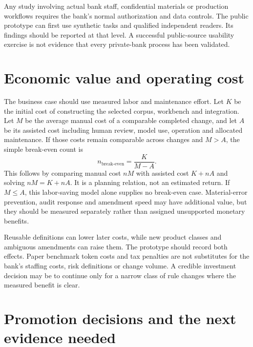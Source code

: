 \documentclass[12pt,a4paper,oneside,openany]{book}
\begin{document}
Any study involving actual bank staff, confidential materials or production
workflows requires the bank's normal authorization and data controls. The public
prototype can first use synthetic tasks and qualified independent readers.
Its findings should be reported at that level. A successful public-source
usability exercise is not evidence that every private-bank process has been
validated.

\section{Economic value and operating cost}
\label{merge:P-04-prototype:06}


The business case should use measured labor and maintenance effort. Let $K$ be
the initial cost of constructing the selected corpus, workbench and integration.
Let $M$ be the average manual cost of a comparable completed change, and let $A$
be its assisted cost including human review, model use, operation and allocated
maintenance. If those costs remain comparable across changes and $M>A$, the
simple break-even count is
\begin{equation}
 n_{\mathrm{break\text{-}even}}=\frac{K}{M-A}.
 \label{eq:cost}
\end{equation}
This follows by comparing manual cost $nM$ with assisted cost $K+nA$ and solving
$nM=K+nA$. It is a planning relation, not an estimated return. If $M\leq A$, this
labor-saving model alone supplies no break-even case. Material-error prevention,
audit response and amendment speed may have additional value, but they should be
measured separately rather than assigned unsupported monetary benefits.

Reusable definitions can lower later costs, while new product classes and
ambiguous amendments can raise them. The prototype should record both effects.
Paper benchmark token costs and tax penalties are not substitutes for the bank's
staffing costs, risk definitions or change volume. A credible investment decision
may be to continue only for a narrow class of rule changes where the measured
benefit is clear.

\section{Promotion decisions and the next evidence needed}
\label{merge:M09:12}
\end{document}
